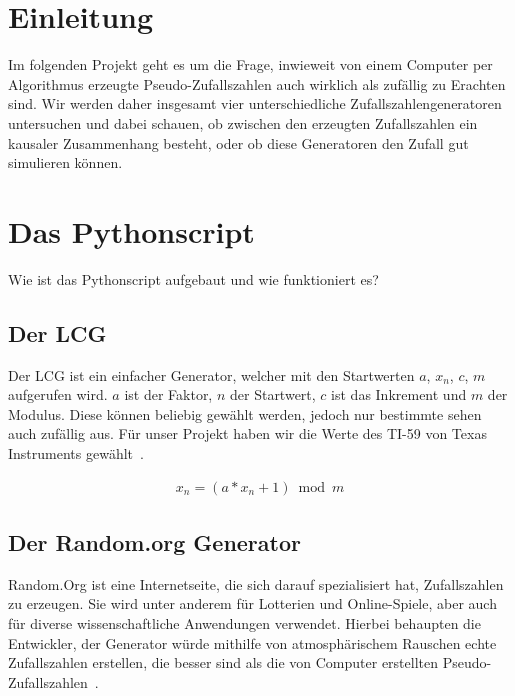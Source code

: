 \documentclass[12pt]{article}
\title{\testbf{Zufallszahlen Spektraltest}}
\author{Christian Locatelli, Alexander Wallrodt}
\date{\today}
\begin{document}
    \maketitle
    \clearpage

    \tableofcontents
    \listoftables
    \listoffigures

    \clearpage


    \section{Einleitung}\label{sec:Einleitung}
    Im folgenden Projekt geht es um die Frage, inwieweit von einem Computer per Algorithmus erzeugte Pseudo-Zufallszahlen
    auch wirklich als zufällig zu Erachten sind.
    Wir werden daher insgesamt vier unterschiedliche Zufallszahlengeneratoren untersuchen und dabei schauen,
    ob zwischen den erzeugten Zufallszahlen ein kausaler Zusammenhang besteht,
    oder ob diese Generatoren den Zufall gut simulieren können.



    \section{Das Pythonscript}\label{sec:das-pythonscript}
    Wie ist das Pythonscript aufgebaut und wie funktioniert es?

    \subsection{Der LCG}\label{subsec:der-lcg}
    Der LCG ist ein einfacher Generator, welcher mit den Startwerten $a$, $x_n$, $c$, $m$ aufgerufen wird.
    $a$ ist der Faktor, $n$ der Startwert, $c$ ist das Inkrement und $m$ der Modulus.
    Diese können beliebig gewählt werden, jedoch nur bestimmte sehen auch zufällig aus.
    Für unser Projekt haben wir die Werte des TI-59 von Texas Instruments gewählt~\cite{lcg}.

    \begin{align*}
    x_n = (a * x_n + 1) \bmod m
    \end{align*}

    \subsection{Der Random.org Generator}\label{subsec:der-random.org-generator}
    Random.Org ist eine Internetseite, die sich darauf spezialisiert hat, Zufallszahlen zu erzeugen.
    Sie wird unter anderem für Lotterien und Online-Spiele, aber auch für diverse wissenschaftliche
    Anwendungen verwendet.
    Hierbei behaupten die Entwickler, der Generator würde mithilfe von atmosphärischem
    Rauschen echte Zufallszahlen erstellen, die besser sind als die von Computer erstellten Pseudo-Zufallszahlen~\cite{random-org}.
\end{document}
